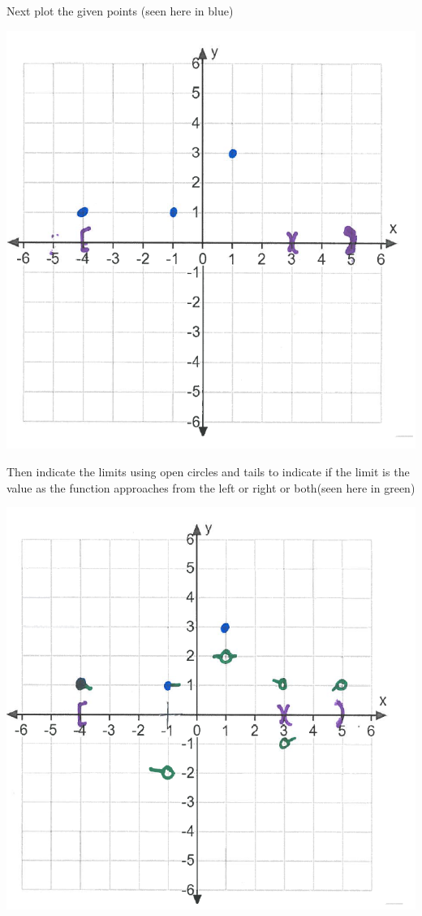 \documentclass[nooutcomes]{ximera}
\begin{document}
\begin{problem}
\begin{freeResponse}
	Next plot the given points (seen here in blue)
	    \begin{image}
		\includegraphics[scale=.5]{"Sketching stage 2"}
  	  \end{image}
	
	Then indicate the limits using open circles and tails to indicate if the limit is the value as the function approaches from the left or right or both(seen here in green)
	    \begin{image}
	\includegraphics[scale=.5]{"Sketching stage 3"}
	    \end{image}


\end{freeResponse}
\end{problem}
\end{document}
